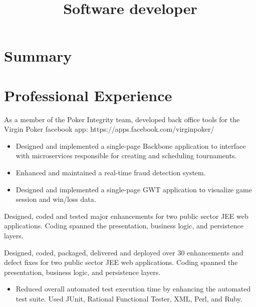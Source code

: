 \documentclass[11pt,letterpaper,sans]{moderncv}   %
\title{Software developer}               %
\begin{document}
\maketitle

\section{Summary}

\section{Professional Experience}
{}
\smallskip

{As a member of the Poker Integrity team, developed back office tools for the Virgin Poker facebook app: https://apps.facebook.com/virginpoker/
{\begin{itemize}
\item Designed and implemented a single-page Backbone application to interface with microservices responsible for
creating and scheduling tournaments.
\item Enhanced and maintained a real-time fraud detection system.
\item Designed and implemented a single-page GWT application to visualize game session and win/loss data.
\end{itemize}}}
\smallskip

{Designed, coded and tested major enhancements for two public sector
JEE web applications.
Coding spanned the presentation, business logic, and persistence layers.}
\smallskip

{Designed, coded, packaged, delivered and deployed over 30 enhancements
and defect fixes for two public sector JEE web applications.
Coding spanned the presentation, business logic, and persistence layers.
{\begin{itemize}
\item 
Reduced overall automated test execution time by enhancing the automated test suite.
Used JUnit, Rational Functional Tester, XML, Perl, and Ruby.
\end{itemize}}}
\smallskip
\end{document}
